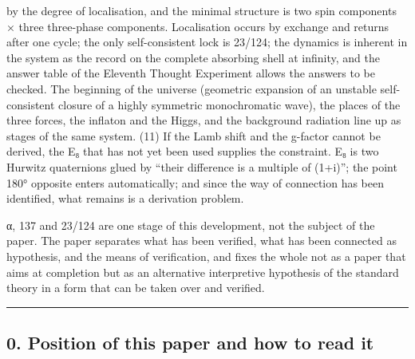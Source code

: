 \documentclass[
  a4paper,
]{article}
\begin{document}
by the degree of localisation, and the minimal structure is two spin
components × three three-phase components. Localisation occurs by
exchange and returns after one cycle; the only self-consistent lock is
23/124; the dynamics is inherent in the system as the record on the
complete absorbing shell at infinity, and the answer table of the
Eleventh Thought Experiment allows the answers to be checked. The
beginning of the universe (geometric expansion of an unstable
self-consistent closure of a highly symmetric monochromatic wave), the
places of the three forces, the inflaton and the Higgs, and the
background radiation line up as stages of the same system. (11) If the
Lamb shift and the g-factor cannot be derived, the E₈ that has not yet
been used supplies the constraint. E₈ is two Hurwitz quaternions glued
by ``their difference is a multiple of (1+i)''; the point 180° opposite
enters automatically; and since the way of connection has been
identified, what remains is a derivation problem.

α, 137 and 23/124 are one stage of this development, not the subject of
the paper. The paper separates what has been verified, what has been
connected as hypothesis, and the means of verification, and fixes the
whole not as a paper that aims at completion but as an alternative
interpretive hypothesis of the standard theory in a form that can be
taken over and verified.

\begin{center}\rule{0.5\linewidth}{0.5pt}\end{center}

\subsection{0. Position of this paper and how to read
it}\label{position-of-this-paper-and-how-to-read-it}
\end{document}
